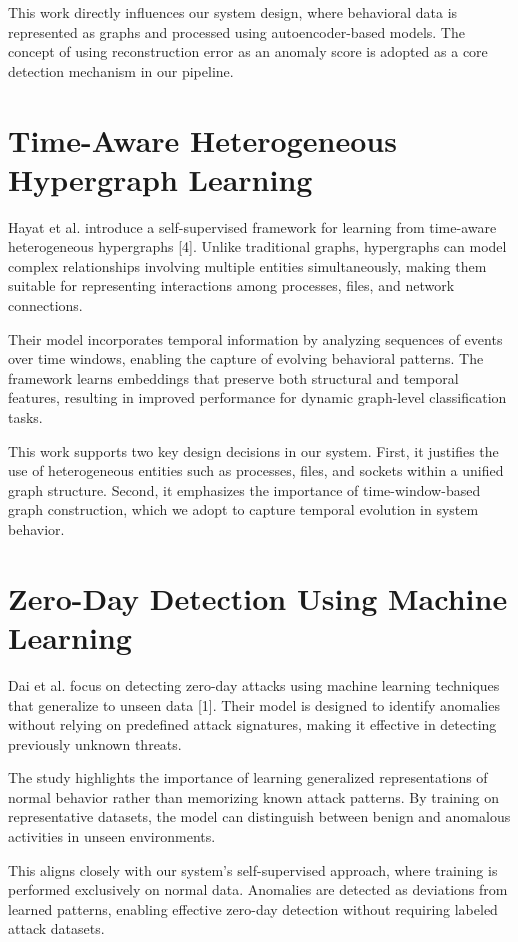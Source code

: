 This work directly influences our system design, where behavioral data is
represented as graphs and processed using autoencoder-based models. The concept
of using reconstruction error as an anomaly score is adopted as a core detection
mechanism in our pipeline.

\section{Time-Aware Heterogeneous Hypergraph Learning}
Hayat et al. introduce a self-supervised framework for learning from
time-aware heterogeneous hypergraphs [4]. Unlike traditional graphs, hypergraphs
can model complex relationships involving multiple entities simultaneously,
making them suitable for representing interactions among processes, files, and
network connections.

Their model incorporates temporal information by analyzing sequences of events
over time windows, enabling the capture of evolving behavioral patterns. The
framework learns embeddings that preserve both structural and temporal features,
resulting in improved performance for dynamic graph-level classification tasks.

This work supports two key design decisions in our system. First, it justifies
the use of heterogeneous entities such as processes, files, and sockets within a
unified graph structure. Second, it emphasizes the importance of time-window-based
graph construction, which we adopt to capture temporal evolution in system
behavior.

\section{Zero-Day Detection Using Machine Learning}
Dai et al. focus on detecting zero-day attacks using machine learning techniques
that generalize to unseen data [1]. Their model is designed to identify anomalies
without relying on predefined attack signatures, making it effective in detecting
previously unknown threats.

The study highlights the importance of learning generalized representations of
normal behavior rather than memorizing known attack patterns. By training on
representative datasets, the model can distinguish between benign and anomalous
activities in unseen environments.

This aligns closely with our system’s self-supervised approach, where training is
performed exclusively on normal data. Anomalies are detected as deviations from
learned patterns, enabling effective zero-day detection without requiring labeled
attack datasets.

